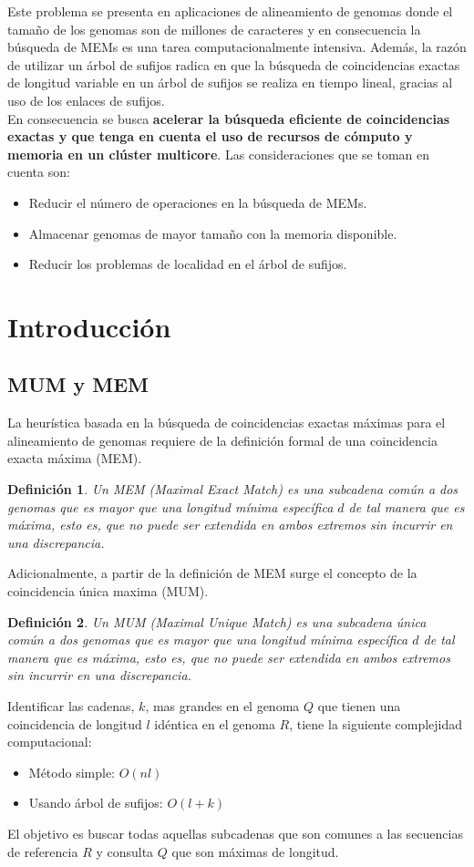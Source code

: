 \documentclass[12pt,a4paper]{article}
\newtheorem{mydef}{Definición}
\begin{document}
\indent
Este problema se presenta en aplicaciones de alineamiento de genomas donde el
tama\~no de los genomas son de millones de caracteres y en consecuencia la búsqueda de MEMs es una tarea computacionalmente intensiva. Además, la razón de utilizar un árbol de sufijos radica en
que la búsqueda de coincidencias exactas de longitud variable en un árbol de 
sufijos se realiza en tiempo lineal, gracias al uso de los enlaces de sufijos.\\
\indent
En consecuencia se busca \textbf{acelerar la búsqueda eficiente de 
coincidencias exactas y que tenga en cuenta el uso de recursos de cómputo y
memoria en un clúster multicore}. Las consideraciones que se toman en cuenta son:
\begin{itemize}
\item Reducir el número de operaciones en la búsqueda de MEMs.
\item Almacenar genomas de mayor tamaño con la memoria disponible.
\item Reducir los problemas de localidad en el árbol de sufijos.
\end{itemize}
\section{Introducción} 
\subsection{MUM y MEM} 
\indent
La heurística basada en la búsqueda de coincidencias exactas máximas para el alineamiento de genomas requiere de la definición formal de una coincidencia exacta máxima (MEM).\\
\begin{mydef}
  Un MEM (Maximal Exact Match) es una subcadena común a dos
  genomas que es mayor que una longitud mínima específica $d$ de tal manera
  que es máxima, esto es, que no puede ser extendida en ambos extremos sin
  incurrir en una discrepancia. 
\end{mydef}
\indent
Adicionalmente, a partir de la definición de MEM surge el concepto de la coincidencia única maxima (MUM).\\
\begin{mydef}Un MUM (Maximal Unique Match) es una subcadena única común a dos genomas que es mayor que una longitud mínima específica $d$ de tal manera que es máxima, esto es, que no puede ser extendida en ambos extremos sin incurrir en una discrepancia.
\end{mydef}
Identificar las cadenas, $k$, mas grandes en el genoma $Q$ que tienen una coincidencia de longitud $l$ idéntica en el genoma $R$, tiene la siguiente complejidad computacional:
\begin{itemize}
  \item Método simple: $O(nl)$
  \item Usando árbol de sufijos: $O(l+k)$
\end{itemize}
\indent
El objetivo es buscar todas aquellas subcadenas que son comunes a las secuencias de referencia $R$ y consulta $Q$ que son máximas de longitud.\\
\end{document}
